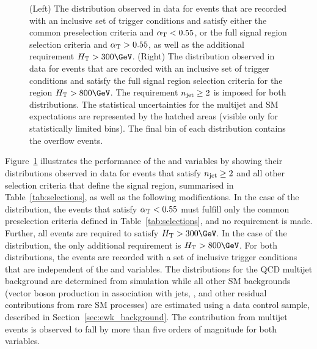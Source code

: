 \begin{figure}[!h]
{%
    (Left) The \alphat distribution observed in data for events that
    are recorded with an inclusive set of trigger conditions and
    satisfy either the common preselection criteria and $\alpha_{\text{T}} <
    0.55$, or the full signal region selection criteria and $\alpha_{\text{T}} >
    0.55$, as well as the additional requirement $\scalht > 300\GeV$.
    (Right) The \bdphi distribution observed in data for events that
    are recorded with an inclusive set of trigger conditions and
    satisfy the full signal region selection criteria for the region
    $\scalht > 800\GeV$. The requirement $n_{\text{jet}} \geq 2$ is imposed for
    both distributions. The statistical uncertainties for the multijet
    and SM expectations are represented by the hatched areas (visible
    only for statistically limited bins). The final bin of each
    distribution contains the overflow events.  }
  \label{fig:alphat-bdphi} 
\end{figure}


Figure~\ref{fig:alphat-bdphi} illustrates the performance of the
\alphat and \bdphi variables by showing their distributions observed
in data for events that satisfy $n_{\text{jet}} \geq 2$ and all other selection
criteria that define the signal region, summarised in
Table~\ref{tab:selections}, as well as the following modifications.
In the case of the \alphat distribution, the events that satisfy
$\alpha_{\text{T}} < 0.55$ must fulfill only the common preselection criteria
defined in Table~\ref{tab:selections}, and no \HTmiss requirement is
made. Further, all events are required to satisfy $\scalht >
300\GeV$. In the case of the \bdphi distribution, the only additional
requirement is $\scalht > 800\GeV$. For both distributions, the events
are recorded with a set of inclusive trigger conditions that are
independent of the \alphat and \bdphi variables. The distributions for
the QCD multijet background are determined from simulation while all
other SM backgrounds (vector boson production in association with
jets, \ttbar, and other residual contributions from rare SM processes)
are estimated using a \mj data control sample, described in
Section~\ref{sec:ewk_background}. The contribution from multijet
events is observed to fall by more than five orders of magnitude for
both variables.

